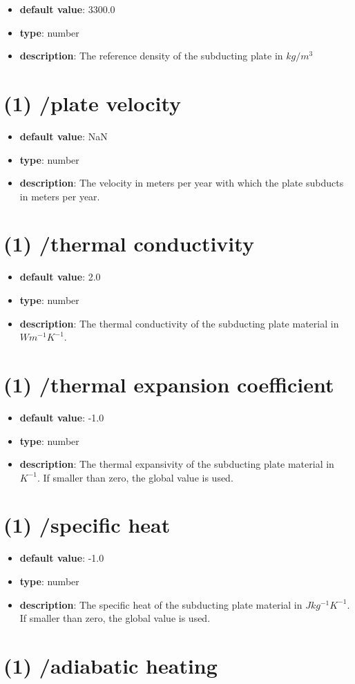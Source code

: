 \begin{itemize}[leftmargin=1em]\item {\bf default value}: 3300.0
\item {\bf type}: number
\item {\bf description}: The reference density of the subducting plate in $kg/m^3$
\end{itemize}\section{(1) /plate velocity}
\begin{itemize}[leftmargin=1em]\item {\bf default value}: NaN
\item {\bf type}: number
\item {\bf description}: The velocity in meters per year with which the plate subducts in meters per year.
\end{itemize}\section{(1) /thermal conductivity}
\begin{itemize}[leftmargin=1em]\item {\bf default value}: 2.0
\item {\bf type}: number
\item {\bf description}: The thermal conductivity of the subducting plate material in $W m^{-1} K^{-1}$.
\end{itemize}\section{(1) /thermal expansion coefficient}
\begin{itemize}[leftmargin=1em]\item {\bf default value}: -1.0
\item {\bf type}: number
\item {\bf description}: The thermal expansivity of the subducting plate material in $K^{-1}$. If smaller than zero, the global value is used.
\end{itemize}\section{(1) /specific heat}
\begin{itemize}[leftmargin=1em]\item {\bf default value}: -1.0
\item {\bf type}: number
\item {\bf description}: The specific heat of the subducting plate material in $J kg^{-1} K^{-1}$. If smaller than zero, the global value is used.
\end{itemize}\section{(1) /adiabatic heating}

